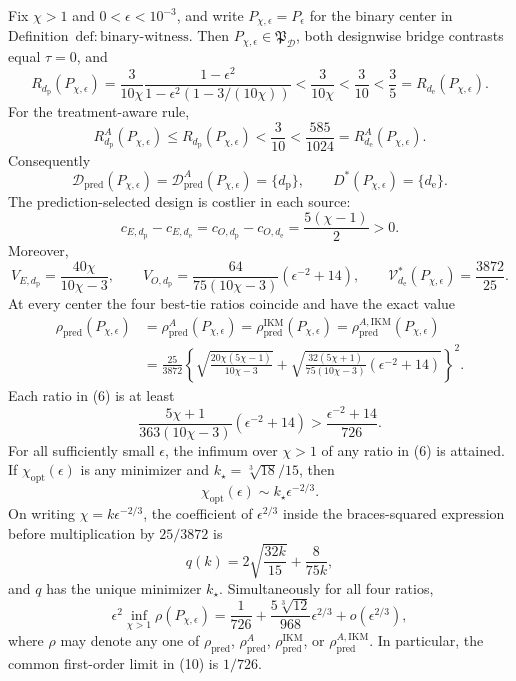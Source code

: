 Fix \(\chi>1\) and \(0<\epsilon<10^{-3}\), and write \(P_{\chi,\epsilon}=P_\epsilon\) for the binary center in Definition~\(\mathrm{def{:}binary\text{-}witness}\).  Then \(P_{\chi,\epsilon}\in\mathfrak P_{\mathcal D}\), both designwise bridge contrasts equal \(\tau=0\), and
\[
 R_{d_{\mathrm p}}(P_{\chi,\epsilon})
 =\frac{3}{10\chi}\frac{1-\epsilon^2}{1-\epsilon^2(1-3/(10\chi))}
 <\frac{3}{10\chi}<\frac3{10}<\frac35
 =R_{d_{\mathrm e}}(P_{\chi,\epsilon}).                                      \tag{1}
\]
For the treatment-aware rule,
\[
 R_{d_{\mathrm p}}^A(P_{\chi,\epsilon})
 \le R_{d_{\mathrm p}}(P_{\chi,\epsilon})<\frac3{10}
 <\frac{585}{1024}
 =R_{d_{\mathrm e}}^A(P_{\chi,\epsilon}).                                  \tag{2}
\]
Consequently
\[
 \mathcal D_{\mathrm{pred}}(P_{\chi,\epsilon})
 =\mathcal D_{\mathrm{pred}}^A(P_{\chi,\epsilon})=\{d_{\mathrm p}\},
 \qquad D^*(P_{\chi,\epsilon})=\{d_{\mathrm e}\}.                          \tag{3}
\]
The prediction-selected design is costlier in each source:
\[
 c_{E,d_{\mathrm p}}-c_{E,d_{\mathrm e}}
 =c_{O,d_{\mathrm p}}-c_{O,d_{\mathrm e}}
 =\frac{5(\chi-1)}2>0.                                                        \tag{4}
\]
Moreover,
\[
 V_{E,d_{\mathrm p}}=\frac{40\chi}{10\chi-3},
 \qquad
 V_{O,d_{\mathrm p}}
 =\frac{64}{75(10\chi-3)}(\epsilon^{-2}+14),
 \qquad
 \mathcal V_{d_{\mathrm e}}^*(P_{\chi,\epsilon})=\frac{3872}{25}.           \tag{5}
\]
At every center the four best-tie ratios coincide and have the exact value
\[
\begin{aligned}
 \rho_{\mathrm{pred}}(P_{\chi,\epsilon})
 &=\rho_{\mathrm{pred}}^A(P_{\chi,\epsilon})
 =\rho_{\mathrm{pred}}^{\mathrm{IKM}}(P_{\chi,\epsilon})
 =\rho_{\mathrm{pred}}^{A,\mathrm{IKM}}(P_{\chi,\epsilon})\\
 &=\frac{25}{3872}
 \left\{
 \sqrt{\frac{20\chi(5\chi-1)}{10\chi-3}}
 +\sqrt{\frac{32(5\chi+1)}{75(10\chi-3)}(\epsilon^{-2}+14)}
 \right\}^{2}.                                                               \tag{6}
\end{aligned}
\]
Each ratio in (6) is at least
\[
 \frac{5\chi+1}{363(10\chi-3)}(\epsilon^{-2}+14)
 >\frac{\epsilon^{-2}+14}{726}.                                               \tag{7}
\]
For all sufficiently small \(\epsilon\), the infimum over \(\chi>1\) of any ratio in (6) is attained.  If \(\chi_{\mathrm{opt}}(\epsilon)\) is any minimizer and \(k_\star=\sqrt[3]{18}/15\), then
\[
 \chi_{\mathrm{opt}}(\epsilon)\sim k_\star\epsilon^{-2/3}.                 \tag{8}
\]
On writing \(\chi=k\epsilon^{-2/3}\), the coefficient of \(\epsilon^{2/3}\) inside the braces-squared expression before multiplication by \(25/3872\) is
\[
 q(k)=2\sqrt{\frac{32k}{15}}+\frac8{75k},                                    \tag{9}
\]
and \(q\) has the unique minimizer \(k_\star\).  Simultaneously for all four ratios,
\[
 \epsilon^2\inf_{\chi>1}\rho(P_{\chi,\epsilon})
 =\frac1{726}+\frac{5\sqrt[3]{12}}{968}\epsilon^{2/3}
 +o(\epsilon^{2/3}),                                                          \tag{10}
\]
where \(\rho\) may denote any one of \(\rho_{\mathrm{pred}}\), \(\rho_{\mathrm{pred}}^A\), \(\rho_{\mathrm{pred}}^{\mathrm{IKM}}\), or \(\rho_{\mathrm{pred}}^{A,\mathrm{IKM}}\).  In particular, the common first-order limit in (10) is \(1/726\).